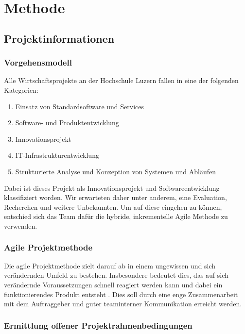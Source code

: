 \chapter{Methode}

\section{Projektinformationen}

\subsection{Vorgehensmodell}

Alle Wirtschaftsprojekte an der Hochschule Luzern fallen in eine der folgenden Kategorien:

\begin{enumerate}
	\item Einsatz von Standardsoftware und Services
	\item Software- und Produktentwicklung
	\item Innovationsprojekt
	\item IT-Infrastrukturentwicklung
	\item Strukturierte Analyse und Konzeption von Systemen und Abläufen
\end{enumerate}

Dabei ist dieses Projekt als Innovationsprojekt und Softwareentwicklung klassifiziert worden. Wir erwarteten daher unter anderem, eine Evaluation, Recherchen und weitere Unbekannten. Um auf diese eingehen zu können, entschied sich das Team dafür die hybride, inkrementelle Agile Methode zu verwenden.

\subsection{Agile Projektmethode}

Die agile Projektmethode zielt darauf ab in einem ungewissen und sich verändernden Umfeld zu bestehen. Insbesondere bedeutet dies, das auf sich verändernde Voraussetzungen schnell reagiert werden kann und dabei ein funktionierendes Produkt entsteht \parencite{AgileAlliance2015}. Dies soll durch eine enge Zusammenarbeit mit dem Auftraggeber und guter teaminterner Kommunikation erreicht werden.

\parencite{BaumannWicki2018}

\subsection{Ermittlung offener Projektrahmenbedingungen}
\label{ch:evaluation}
